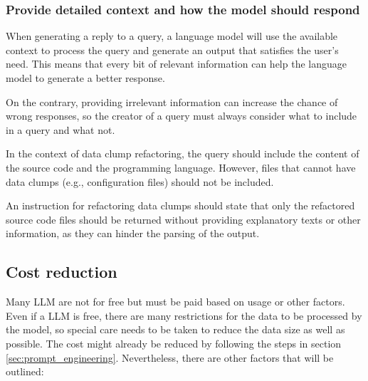 \subsubsection{Provide detailed context and how the model should respond}

When generating a reply to a query, a language model will use the available context to process the query and generate an output that satisfies the user's need. This means that every bit of relevant information can help the language model to generate a better response.

On the contrary, providing irrelevant information can increase the chance of wrong responses, so the creator of a query must always consider what to include in a query and what not. 

In the context of data clump refactoring, the query should include the content of the source code and the programming language. However, files that cannot have data clumps (e.g., configuration files) should not be included.

An instruction for refactoring data clumps should state that only the refactored source code files should be returned without providing explanatory texts or other information, as they can hinder the parsing of the output. 

\subsection{Cost reduction}

Many \ac{LLM} are not for free but must be paid based on usage or other factors. Even if a \ac{LLM} is free, there are many restrictions for the data to be processed by the model, so special care needs to be taken to reduce the data size as well as possible.  The cost might already be reduced by following the steps in section \ref{sec:prompt_engineering}. Nevertheless, there are other factors that will be outlined:


